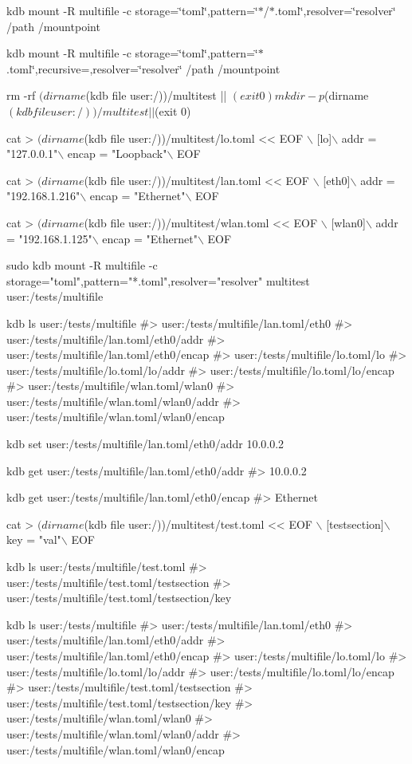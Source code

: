 {\ttfamily kdb mount -\/R multifile -\/c storage=\char`\"{}toml\char`\"{},pattern=\char`\"{}$\ast$/$\ast$.\+toml\char`\"{},resolver=\char`\"{}resolver\char`\"{} /path /mountpoint}

{\ttfamily kdb mount -\/R multifile -\/c storage=\char`\"{}toml\char`\"{},pattern=\char`\"{}$\ast$.\+toml\char`\"{},recursive=,resolver=\char`\"{}resolver\char`\"{} /path /mountpoint}


\begin{DoxyCode}
rm -rf $(dirname $(kdb file user:/))/multitest || $(exit 0)
mkdir -p $(dirname $(kdb file user:/))/multitest || $(exit 0)

cat > $(dirname $(kdb file user:/))/multitest/lo.toml << EOF \(\backslash\)
[lo]\(\backslash\)
addr = "127.0.0.1"\(\backslash\)
encap = "Loopback"\(\backslash\)
EOF

cat > $(dirname $(kdb file user:/))/multitest/lan.toml << EOF \(\backslash\)
[eth0]\(\backslash\)
addr = "192.168.1.216"\(\backslash\)
encap = "Ethernet"\(\backslash\)
EOF

cat > $(dirname $(kdb file user:/))/multitest/wlan.toml << EOF \(\backslash\)
[wlan0]\(\backslash\)
addr = "192.168.1.125"\(\backslash\)
encap = "Ethernet"\(\backslash\)
EOF

sudo kdb mount -R multifile -c storage="toml",pattern="*.toml",resolver="resolver" multitest
       user:/tests/multifile

kdb ls user:/tests/multifile
#> user:/tests/multifile/lan.toml/eth0
#> user:/tests/multifile/lan.toml/eth0/addr
#> user:/tests/multifile/lan.toml/eth0/encap
#> user:/tests/multifile/lo.toml/lo
#> user:/tests/multifile/lo.toml/lo/addr
#> user:/tests/multifile/lo.toml/lo/encap
#> user:/tests/multifile/wlan.toml/wlan0
#> user:/tests/multifile/wlan.toml/wlan0/addr
#> user:/tests/multifile/wlan.toml/wlan0/encap

kdb set user:/tests/multifile/lan.toml/eth0/addr 10.0.0.2

kdb get user:/tests/multifile/lan.toml/eth0/addr
#> 10.0.0.2

kdb get user:/tests/multifile/lan.toml/eth0/encap
#> Ethernet

cat > $(dirname $(kdb file user:/))/multitest/test.toml << EOF \(\backslash\)
[testsection]\(\backslash\)
key = "val"\(\backslash\)
EOF

kdb ls user:/tests/multifile/test.toml
#> user:/tests/multifile/test.toml/testsection
#> user:/tests/multifile/test.toml/testsection/key

kdb ls user:/tests/multifile
#> user:/tests/multifile/lan.toml/eth0
#> user:/tests/multifile/lan.toml/eth0/addr
#> user:/tests/multifile/lan.toml/eth0/encap
#> user:/tests/multifile/lo.toml/lo
#> user:/tests/multifile/lo.toml/lo/addr
#> user:/tests/multifile/lo.toml/lo/encap
#> user:/tests/multifile/test.toml/testsection
#> user:/tests/multifile/test.toml/testsection/key
#> user:/tests/multifile/wlan.toml/wlan0
#> user:/tests/multifile/wlan.toml/wlan0/addr
#> user:/tests/multifile/wlan.toml/wlan0/encap


\end{DoxyCode}
